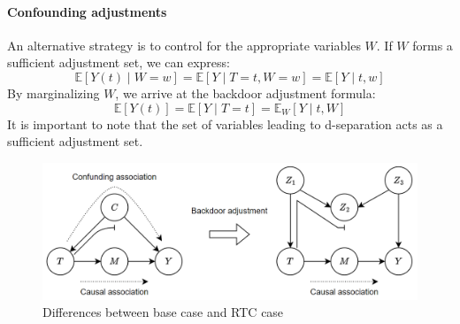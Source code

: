\paragraph*{Confounding adjustments}
An alternative strategy is to control for the appropriate variables $W$. 
If $W$ forms a sufficient adjustment set, we can express:
\[\mathbb{E}\left[Y(t)\mid W=w\right]=\mathbb{E}\left[Y\mid T=t,W=w\right]=\mathbb{E}\left[Y\mid t,w\right]\]
By marginalizing $W$, we arrive at the backdoor adjustment formula:
\[\mathbb{E}\left[Y(t)\right]=\mathbb{E}\left[Y\mid T=t\right]=\mathbb{E}_W\left[Y\mid t,W\right]\]
It is important to note that the set of variables leading to d-separation acts as a sufficient adjustment set.
\begin{figure}[H]
    \centering
    \includegraphics[width=0.75\linewidth]{images/cau3.png}
    \caption{Differences between base case and RTC case}
\end{figure}
